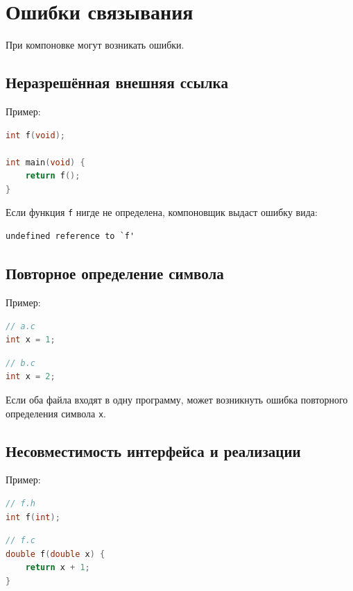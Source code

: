 \documentclass[12pt,a4paper]{article}
\begin{document}
\section{Ошибки связывания}

При компоновке могут возникать ошибки.

\subsection{Неразрешённая внешняя ссылка}

Пример:

\begin{lstlisting}[language=C]
int f(void);

int main(void) {
    return f();
}
\end{lstlisting}

Если функция \texttt{f} нигде не определена, компоновщик выдаст ошибку вида:

\begin{lstlisting}
undefined reference to `f'
\end{lstlisting}

\subsection{Повторное определение символа}

Пример:

\begin{lstlisting}[language=C]
// a.c
int x = 1;
\end{lstlisting}

\begin{lstlisting}[language=C]
// b.c
int x = 2;
\end{lstlisting}

Если оба файла входят в одну программу, может возникнуть ошибка повторного определения символа \texttt{x}.

\subsection{Несовместимость интерфейса и реализации}

Пример:

\begin{lstlisting}[language=C]
// f.h
int f(int);
\end{lstlisting}

\begin{lstlisting}[language=C]
// f.c
double f(double x) {
    return x + 1;
}
\end{lstlisting}
\end{document}
